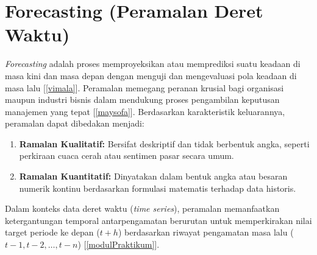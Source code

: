 \documentclass[a4paper,oneside,11pt]{book}
\begin{document}
\section{Forecasting (Peramalan Deret Waktu)}
\textit{Forecasting} adalah proses memproyeksikan atau memprediksi suatu keadaan di masa kini dan masa depan dengan menguji dan mengevaluasi pola keadaan di masa lalu [\ref{vimala}]. Peramalan memegang peranan krusial bagi organisasi maupun industri bisnis dalam mendukung proses pengambilan keputusan manajemen yang tepat [\ref{maysofa}]. Berdasarkan karakteristik keluarannya, peramalan dapat dibedakan menjadi:
\begin{enumerate}
    \item \textbf{Ramalan Kualitatif:} Bersifat deskriptif dan tidak berbentuk angka, seperti perkiraan cuaca cerah atau sentimen pasar secara umum.
    \item \textbf{Ramalan Kuantitatif:} Dinyatakan dalam bentuk angka atau besaran numerik kontinu berdasarkan formulasi matematis terhadap data historis.
\end{enumerate}
Dalam konteks data deret waktu (\textit{time series}), peramalan memanfaatkan ketergantungan temporal antarpengamatan berurutan untuk memperkirakan nilai target periode ke depan ($t+h$) berdasarkan riwayat pengamatan masa lalu ($t-1, t-2, \dots, t-n$) [\ref{modulPraktikum}].
\end{document}
